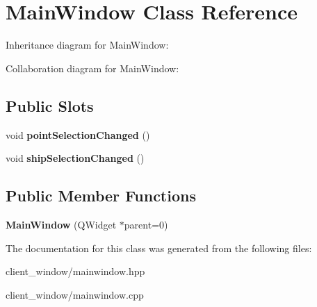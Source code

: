 \hypertarget{classMainWindow}{}\section{Main\+Window Class Reference}
\label{classMainWindow}


Inheritance diagram for Main\+Window\+:


Collaboration diagram for Main\+Window\+:
\subsection*{Public Slots}
\begin{DoxyCompactItemize}
\item 
void {\bfseries point\+Selection\+Changed} ()\hypertarget{classMainWindow_a73fac02c2493063e8506d15efd884e3f}{}\label{classMainWindow_a73fac02c2493063e8506d15efd884e3f}

\item 
void {\bfseries ship\+Selection\+Changed} ()\hypertarget{classMainWindow_abbeb4fcfec5ba70d1ea02a25ad01cead}{}\label{classMainWindow_abbeb4fcfec5ba70d1ea02a25ad01cead}

\end{DoxyCompactItemize}
\subsection*{Public Member Functions}
\begin{DoxyCompactItemize}
\item 
{\bfseries Main\+Window} (Q\+Widget $\ast$parent=0)\hypertarget{classMainWindow_a8b244be8b7b7db1b08de2a2acb9409db}{}\label{classMainWindow_a8b244be8b7b7db1b08de2a2acb9409db}

\end{DoxyCompactItemize}


The documentation for this class was generated from the following files\+:\begin{DoxyCompactItemize}
\item 
client\+\_\+window/mainwindow.\+hpp\item 
client\+\_\+window/mainwindow.\+cpp\end{DoxyCompactItemize}
